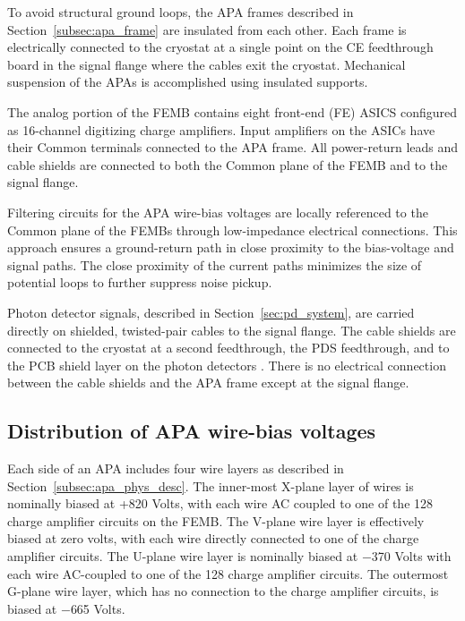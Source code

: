 To avoid structural ground loops, the APA frames described in Section~\ref{subsec:apa_frame} 
are insulated from each other. Each frame is electrically connected to the cryostat at a single 
point on the CE feedthrough board in the signal flange where the cables exit the cryostat. Mechanical suspension of the APAs 
is accomplished using insulated supports. 

The analog portion of the FEMB contains eight front-end (FE) ASICS configured as 16-channel 
digitizing charge amplifiers. Input amplifiers on the ASICs have their Common terminals connected 
to the APA frame.  All power-return leads and cable shields 
are connected to both the Common plane of the FEMB and to the signal flange.

Filtering circuits for the APA wire-bias voltages are locally referenced to the Common plane of the FEMBs through low-impedance 
electrical connections. This approach ensures a ground-return path in close proximity to the 
bias-voltage and signal paths. The close proximity of the current paths minimizes the size of potential loops to further 
suppress noise pickup.

Photon detector signals, described in Section~\ref{sec:pd_system}, are carried directly on shielded, 
twisted-pair cables to the signal flange. The cable shields are connected to the 
cryostat at a second feedthrough, the PDS feedthrough, and to the PCB shield layer on the photon detectors . There is no 
electrical connection between the cable shields and the APA frame except at the signal flange.

%
\subsection{Distribution of APA wire-bias voltages}
\label{subsec:ce_wire_bias}

Each side of an APA includes four wire layers as described in Section~\ref{subsec:apa_phys_desc}. 
The inner-most X-plane layer of wires is nominally biased at +820 Volts, with each wire AC coupled 
to one of the 128 charge amplifier circuits on the FEMB. The V-plane wire layer is effectively biased at zero volts, 
with each wire directly connected to one of the charge amplifier circuits. The U-plane wire layer is nominally 
biased at $-$370 Volts with each wire AC-coupled 
to one of the 128 charge amplifier circuits. The outermost G-plane wire layer,
which has no connection to the charge amplifier circuits, is biased at $-$665 Volts.

